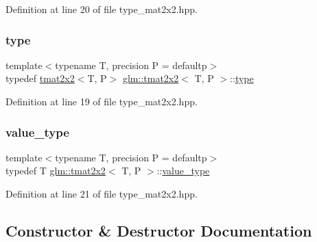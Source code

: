 Definition at line 20 of file type\+\_\+mat2x2.\+hpp.

\mbox{\label{structglm_1_1tmat2x2_ab558dcd4da9d21b6c5c5681ec536d6e1}} 
\subsubsection{\texorpdfstring{type}{type}}
{\footnotesize\ttfamily template$<$typename T, precision P = defaultp$>$ \\
typedef \mbox{\hyperlink{structglm_1_1tmat2x2}{tmat2x2}}$<$T, P$>$ \mbox{\hyperlink{structglm_1_1tmat2x2}{glm\+::tmat2x2}}$<$ T, P $>$\+::\mbox{\hyperlink{structglm_1_1tmat2x2_ab558dcd4da9d21b6c5c5681ec536d6e1}{type}}}



Definition at line 19 of file type\+\_\+mat2x2.\+hpp.

\mbox{\label{structglm_1_1tmat2x2_aeac2c876456c92309d99f949824710b5}} 
\subsubsection{\texorpdfstring{value\_type}{value\_type}}
{\footnotesize\ttfamily template$<$typename T, precision P = defaultp$>$ \\
typedef T \mbox{\hyperlink{structglm_1_1tmat2x2}{glm\+::tmat2x2}}$<$ T, P $>$\+::\mbox{\hyperlink{structglm_1_1tmat2x2_aeac2c876456c92309d99f949824710b5}{value\+\_\+type}}}



Definition at line 21 of file type\+\_\+mat2x2.\+hpp.



\subsection{Constructor \& Destructor Documentation}
\mbox{\label{structglm_1_1tmat2x2_a4618ed5c3103b8bae249fe6f74b14ce4}} 
